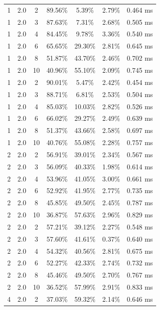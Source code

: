 \documentclass[11pt,a4paper]{article}
\begin{document}
\begin{longtable}{ccccccc}
        1 & 2.0 & 2 & 89.56\% & 5.39\% & 2.79\% & 0.464 ms \\
        1 & 2.0 & 3 & 87.63\% & 7.31\% & 2.68\% & 0.505 ms \\
        1 & 2.0 & 4 & 84.45\% & 9.78\% & 3.36\% & 0.540 ms \\
        1 & 2.0 & 6 & 65.65\% & 29.30\% & 2.81\% & 0.645 ms \\
        1 & 2.0 & 8 & 51.87\% & 43.70\% & 2.46\% & 0.702 ms \\
        1 & 2.0 & 10 & 40.96\% & 55.10\% & 2.09\% & 0.745 ms \\
        1 & 2.0 & 2 & 90.01\% & 5.47\% & 2.42\% & 0.454 ms \\
        1 & 2.0 & 3 & 88.71\% & 6.81\% & 2.53\% & 0.504 ms \\
        1 & 2.0 & 4 & 85.03\% & 10.03\% & 2.82\% & 0.526 ms \\
        1 & 2.0 & 6 & 66.02\% & 29.27\% & 2.49\% & 0.639 ms \\
        1 & 2.0 & 8 & 51.37\% & 43.66\% & 2.58\% & 0.697 ms \\
        1 & 2.0 & 10 & 40.76\% & 55.08\% & 2.28\% & 0.757 ms \\
        \midrule
        2 & 2.0 & 2 & 56.91\% & 39.01\% & 2.34\% & 0.567 ms \\
        2 & 2.0 & 3 & 56.09\% & 40.33\% & 1.98\% & 0.614 ms \\
        2 & 2.0 & 4 & 53.96\% & 41.05\% & 3.00\% & 0.661 ms \\
        2 & 2.0 & 6 & 52.92\% & 41.95\% & 2.77\% & 0.735 ms \\
        2 & 2.0 & 8 & 45.85\% & 49.50\% & 2.45\% & 0.787 ms \\
        2 & 2.0 & 10 & 36.87\% & 57.63\% & 2.96\% & 0.829 ms \\
        2 & 2.0 & 2 & 57.21\% & 39.12\% & 2.27\% & 0.548 ms \\
        2 & 2.0 & 3 & 57.60\% & 41.61\% & 0.37\% & 0.640 ms \\
        2 & 2.0 & 4 & 54.32\% & 40.56\% & 2.81\% & 0.675 ms \\
        2 & 2.0 & 6 & 52.27\% & 42.33\% & 2.74\% & 0.732 ms \\
        2 & 2.0 & 8 & 45.46\% & 49.50\% & 2.70\% & 0.767 ms \\
        2 & 2.0 & 10 & 36.52\% & 57.99\% & 2.91\% & 0.833 ms \\
        \midrule
        4 & 2.0 & 2 & 37.03\% & 59.32\% & 2.14\% & 0.646 ms \\

\end{longtable}
\end{document}
